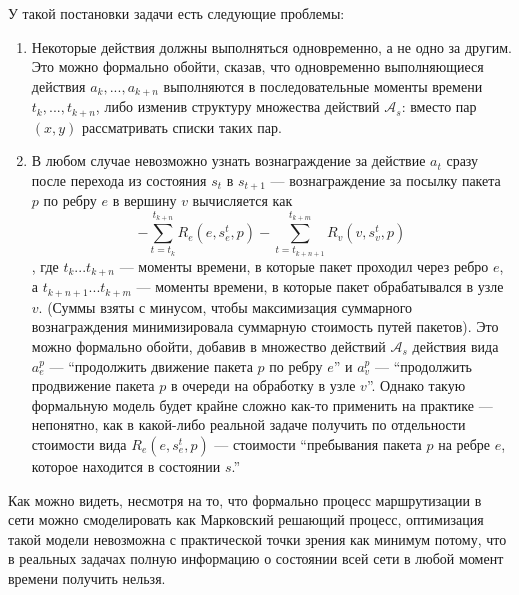 \documentclass[specification, annotation]{itmo-student-thesis}
\begin{document}
У такой постановки задачи есть следующие проблемы:
\begin{enumerate}
\item Некоторые действия должны выполняться одновременно, а не одно за другим.
  Это можно формально обойти, сказав, что одновременно выполняющиеся действия
  $a_k, ... , a_{k+n}$ выполняются в последовательные моменты времени
  $t_k, ... , t_{k+n}$, либо изменив структуру множества действий
  $\mathcal{A}_s$: вместо пар $(x, y)$ рассматривать списки таких пар.
\item В любом случае невозможно узнать вознаграждение за действие $a_t$ сразу
  после перехода из состояния $s_t$ в $s_{t+1}$ --- вознаграждение за посылку
  пакета $p$ по ребру $e$ в вершину $v$ вычисляется как
  \[
  - \sum\limits_{t=t_k}^{t_{k+n}} {R_e(e, s_e^t, p)} -
  \sum\limits_{t=t_{k+n+1}}^{t_{k+m}} R_v(v, s_v^t, p)
  \]
  , где $t_k ... t_{k+n}$ --- моменты времени, в которые пакет проходил через
  ребро $e$, а $t_{k+n+1} ... t_{k+m}$ --- моменты времени, в которые пакет
  обрабатывался в узле $v$. (Суммы взяты с минусом, чтобы максимизация
  суммарного вознаграждения минимизировала суммарную стоимость путей пакетов).
  Это можно формально обойти, добавив в множество действий $\mathcal{A}_s$
  действия вида $a_e^p$ --- ``продолжить движение пакета
  $p$ по ребру $e$'' и $a_v^p$ --- ``продолжить продвижение пакета $p$ в очереди на
  обработку в узле $v$''. Однако такую формальную модель будет крайне сложно
  как-то применить на практике --- непонятно, как в какой-либо реальной задаче
  получить по отдельности стоимости вида $R_e(e, s_e^t, p)$ --- стоимости
  ``пребывания пакета $p$ на ребре $e$, которое находится в состоянии $s$.''
\end{enumerate}

Как можно видеть, несмотря на то, что формально процесс маршрутизации в сети
можно смоделировать как Марковский решающий процесс, оптимизация такой модели
невозможна с практической точки зрения как минимум потому, что в реальных
задачах полную информацию о состоянии всей сети в любой момент времени получить
нельзя.
\end{document}
